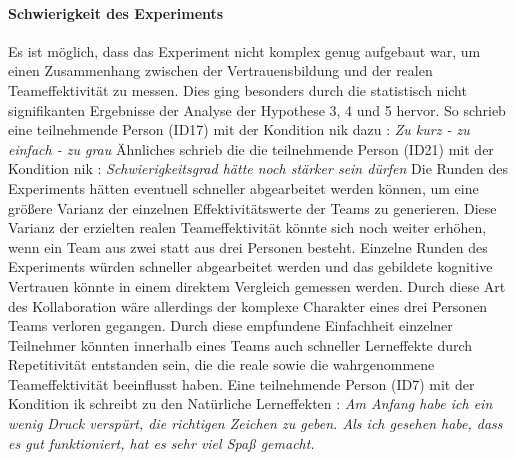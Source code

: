 \documentclass[a4paper,11pt]{article}%
\renewcommand{\\}{\vspace*{0.5\baselineskip} \newline}
\begin{document}
\paragraph{Schwierigkeit des Experiments}
\label{Schwierigkeit des Experiments}
Es ist möglich, dass das Experiment nicht komplex genug aufgebaut war, um einen Zusammenhang zwischen der Vertrauensbildung und der realen Teameffektivität zu messen.
Dies ging besonders durch die statistisch nicht signifikanten Ergebnisse der Analyse der Hypothese 3, 4 und 5 hervor. 
So schrieb eine teilnehmende Person (ID17) mit der Kondition \ac{nik} dazu :\\
\dq{}\textit{Zu kurz - zu einfach - zu grau}\dq{} \\
Ähnliches schrieb die die teilnehmende Person (ID21) mit der Kondition \ac{nik} : \\
\dq{}\textit{Schwierigkeitsgrad hätte noch stärker sein dürfen}\dq{} \\
Die Runden des Experiments hätten eventuell schneller abgearbeitet werden können, um eine größere Varianz der einzelnen Effektivitätswerte der Teams zu generieren. 
Diese Varianz der erzielten realen Teameffektivität könnte sich noch weiter erhöhen, wenn ein Team aus zwei statt aus drei Personen besteht. Einzelne Runden des Experiments würden schneller abgearbeitet werden und das gebildete kognitive Vertrauen könnte in einem direktem Vergleich gemessen werden.
Durch diese Art des Kollaboration wäre allerdings der komplexe Charakter eines drei Personen Teams verloren gegangen.\newline
Durch diese empfundene Einfachheit einzelner Teilnehmer könnten innerhalb eines Teams auch schneller Lerneffekte durch Repetitivität entstanden sein, die die reale sowie die wahrgenommene Teameffektivität beeinflusst haben.
Eine teilnehmende Person (ID7) mit der Kondition \ac{ik} schreibt zu den Natürliche Lerneffekten : \\
\dq{}\textit{Am Anfang habe ich ein wenig Druck verspürt, die richtigen Zeichen zu geben. Als ich gesehen habe, dass es gut funktioniert, hat es sehr viel Spaß gemacht.}\dq{} 



%			
\end{document}
